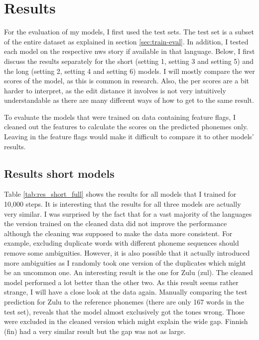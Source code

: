 \section{Results}

For the evaluation of my models, I first used the test sets. The test set is a subset of the entire dataset as explained in section \ref{sec:train-eval}. In addition, I tested each model on the respective \ac{nws} story if available in that language. Below, I first discuss the results separately for the short (setting 1, setting 3 and setting 5) and the long (setting 2, setting 4 and setting 6) models. I will mostly compare the \ac{wer} scores of the model, as this is common in research. Also, the \ac{per} scores are a bit harder to interpret, as the edit distance it involves is not very intuitively understandable as there are many different ways of how to get to the same result. 

To evaluate the models that were trained on data containing feature flags, I cleaned out the features to calculate the scores on the predicted phonemes only. Leaving in the feature flags would make it difficult to compare it to other models' results.

\subsection{Results short models}
Table \ref{tab:res_short_full} shows the results for all models that I trained for 10,000 steps. It is interesting that the results for all three models are actually very similar. I was surprised by the fact that for a vast majority of the languages the version trained on the cleaned data did not improve the performance although the cleaning was supposed to make the data more consistent. For example, excluding duplicate words with different phoneme sequences should remove some ambiguities. However, it is also possible that it actually introduced more ambiguities as I randomly took one version of the duplicates which might be an uncommon one. An interesting result is the one for Zulu (zul). The cleaned model performed a lot better than the other two. As this result seems rather strange, I will have a close look at the data again. Manually comparing the test prediction for Zulu to the reference phonemes (there are only 167 words in the test set), reveals that the model almost exclusively got the tones wrong. Those were excluded in the cleaned version which might explain the wide gap. Finnish (fin) had a very similar result but the gap was not as large.

